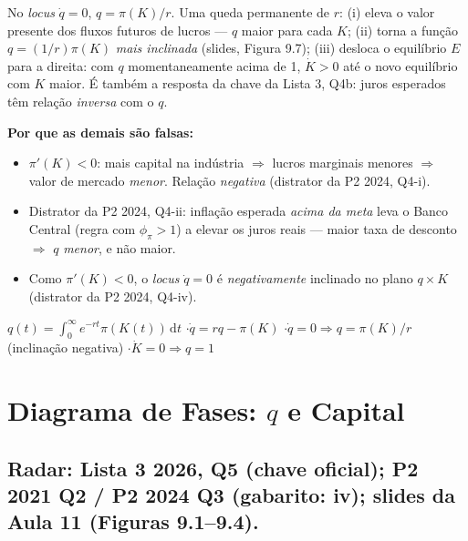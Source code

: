 \documentclass[12pt, a4paper]{article}
\newcommand{\dif}{\mathrm{d}}
\begin{document}
\begin{correctbox}[title={Resposta correta: d)}]
No \emph{locus} $\dot{q}=0$, $q = \pi(K)/r$. Uma queda permanente de $r$:
(i) eleva o valor presente dos fluxos futuros de lucros --- $q$ maior para cada
$K$; (ii) torna a função $q = (1/r)\pi(K)$ \emph{mais inclinada} (slides,
Figura 9.7); (iii) desloca o equilíbrio $E$ para a direita: com $q$
momentaneamente acima de 1, $\dot{K} > 0$ até o novo equilíbrio com $K$ maior.
É também a resposta da chave da Lista 3, Q4b: juros esperados têm relação
\emph{inversa} com o $q$. \checkmark

\textbf{Por que as demais são falsas:}
\begin{itemize}[leftmargin=*]
\item[a)] $\pi'(K) < 0$: mais capital na indústria $\Rightarrow$ lucros
marginais menores $\Rightarrow$ valor de mercado \emph{menor}. Relação
\emph{negativa} (distrator da P2 2024, Q4-i).
\item[b)] Distrator da P2 2024, Q4-ii: inflação esperada \emph{acima da meta}
leva o Banco Central (regra com $\phi_\pi > 1$) a elevar os juros reais ---
maior taxa de desconto $\Rightarrow$ $q$ \emph{menor}, e não maior.
\item[c)] Como $\pi'(K)<0$, o \emph{locus} $\dot{q}=0$ é \emph{negativamente}
inclinado no plano $q \times K$ (distrator da P2 2024, Q4-iv).
\end{itemize}
\end{correctbox}

\begin{formulabox}[title={Para memorizar}]
$q(t) = \displaystyle\int_0^\infty e^{-rt}\pi(K(t))\,\dif t$
\quad$\cdot$\quad $\dot{q} = rq - \pi(K)$
\quad$\cdot$\quad $\dot{q}=0 \Rightarrow q = \pi(K)/r$ (inclinação negativa)
\quad$\cdot$\quad $\dot{K}=0 \Rightarrow q = 1$
\end{formulabox}

\section{Diagrama de Fases: $q$ e Capital}

\subsection{Radar: Lista 3 2026, Q5 (chave oficial); P2 2021 Q2 / P2 2024 Q3 (gabarito: iv); slides da Aula 11 (Figuras 9.1--9.4).}
\end{document}
